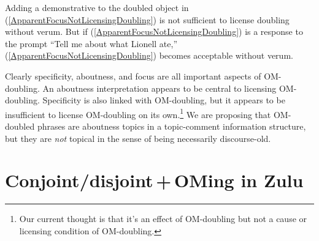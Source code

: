 \documentclass[output=paper]{langscibook}
\begin{document}
\noindent Adding a demonstrative to the doubled object in (\ref{ApparentFocusNotLicensingDoubling}) is not sufficient to license doubling without verum. But if (\ref{ApparentFocusNotLicensingDoubling}) is a response to the prompt ``Tell me about what Lionell ate,'' (\ref{ApparentFocusNotLicensingDoubling}) becomes acceptable without verum. 

Clearly specificity, aboutness, and focus are all important aspects of OM-dou\-bling.
An aboutness interpretation appears to be central to licensing OM-dou\-bling. Specificity is also linked with OM-doubling, but it appears to be insufficient to license OM-doubling on its own.\footnote{Our current thought is that it's an effect of OM-doubling but not a cause or licensing condition of OM-doubling.} We are proposing that OM-doubled phrases are aboutness topics in a topic-comment information structure, but they are \textit{not} topical in the sense of being necessarily discourse-old. 

\section{Conjoint/disjoint\,+\,OMing in Zulu \citep{Zeller:2015:ZuluDrD}} \label{SectLitReview}




\end{document}
